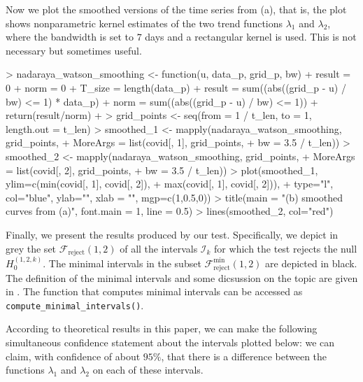 \documentclass[a4paper]{scrartcl}
\begin{document}
Now we plot the smoothed versions of the time series from (a), that is, the plot shows nonparametric kernel estimates of the two trend functions $\lambda_1$ and $\lambda_2$, where the bandwidth is set to $7$ days and a rectangular kernel is used. This is not necessary but sometimes useful.
\begin{Schunk}
\begin{Sinput}
> nadaraya_watson_smoothing <- function(u, data_p, grid_p, bw){
+   result      = 0
+   norm        = 0
+   T_size      = length(data_p)
+   result = sum((abs((grid_p - u) / bw) <= 1) * data_p)
+   norm = sum((abs((grid_p - u) / bw) <= 1))
+   return(result/norm)
+ }
> grid_points <- seq(from = 1 / t_len, to = 1, length.out = t_len)
> smoothed_1  <- mapply(nadaraya_watson_smoothing, grid_points,
+                       MoreArgs = list(covid[, 1], grid_points,
+                                       bw = 3.5 / t_len))
> smoothed_2  <- mapply(nadaraya_watson_smoothing, grid_points,
+                       MoreArgs = list(covid[, 2], grid_points, 
+                                       bw = 3.5 / t_len))
> plot(smoothed_1, ylim=c(min(covid[, 1], covid[, 2]),
+                         max(covid[, 1], covid[, 2])), 
+      type="l", col="blue", ylab="", xlab = "", mgp=c(1,0.5,0))
> title(main = "(b) smoothed curves from (a)", font.main = 1, line = 0.5)
> lines(smoothed_2, col="red")
\end{Sinput}
\end{Schunk}

Finally, we present the results produced by our test. Specifically, we depict in grey the set $\mathcal{F}_{\text{reject}}(1,2)$ of all the intervals $\mathcal{I}_k$ for which the test rejects the null $H_0^{(1, 2, k)}$. The minimal intervals in the subset $\mathcal{F}_{\text{reject}}^{\text{min}}(1, 2)$ are depicted in black. The definition of the minimal intervals and some dicsussion on the topic are given in \cite{KhismatullinaVogt2020b}. The function that computes minimal intervals can be accessed as \verb|compute_minimal_intervals()|.

According to theoretical results in this paper, we can make the following simultaneous confidence statement about the intervals plotted below: we can claim, with confidence of about $95\%$, that there is a difference between the functions $\lambda_1$ and $\lambda_2$ on each of these intervals.
\end{document}
